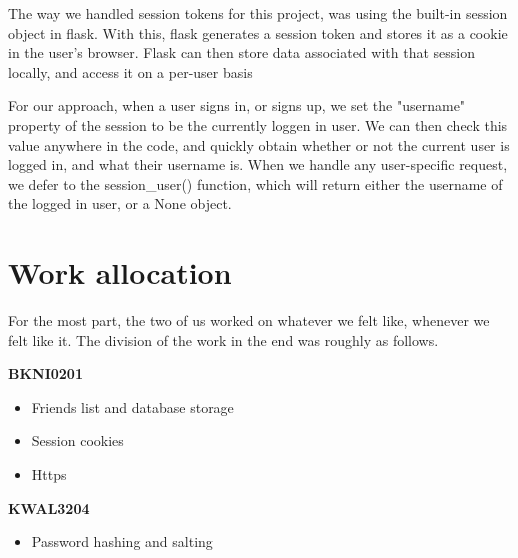 \documentclass[12pt]{article}
\begin{document}
The way we handled session tokens for this project, was using the built-in session object in flask. With this, flask generates a session token and stores it as a cookie in the user's browser. Flask can then store data associated with that session locally, and access it on a per-user basis

For our approach, when a user signs in, or signs up, we set the "username" property of the session to be the currently loggen in user. We can then check this value anywhere in the code, and quickly obtain whether or not the current user is logged in, and what their username is. When we handle any user-specific request, we defer to the session\_user() function, which will return either the username of the logged in user, or a None object.

\section{Work allocation}

For the most part, the two of us worked on whatever we felt like, whenever we felt like it. The division of the work in the end was roughly as follows.
\newline

\noindent \textbf{BKNI0201}

\begin{itemize}
\item Friends list and database storage
\item Session cookies
\item Https
\end{itemize}

\noindent \textbf{KWAL3204}

\begin{itemize}
\item Password hashing and salting
\end{itemize}
\end{document}
